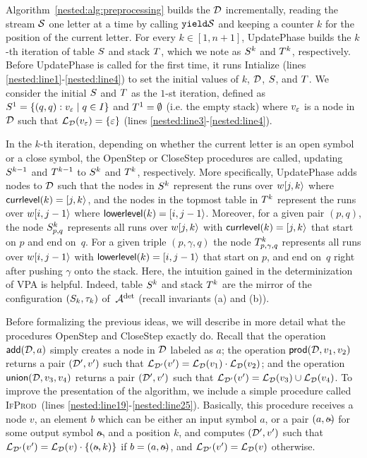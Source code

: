 Algorithm~\ref{nested:alg:preprocessing} builds the \dsepsabbr $\mathcal{D}$ incrementally, reading the stream $\mathcal{S}$ one letter at a time by calling $\texttt{yield}{\mathcal{S}}$ and keeping a counter $k$ for the position of the current letter. 
For every $k \in [1,n+1]$, {\sc UpdatePhase} builds the $k$-th iteration of table $S$ and stack $T$, which we note as $S^k$ and $T^k$, respectively. 
Before {\sc UpdatePhase} is called for the first time, it runs {\sc Intialize} (lines \ref{nested:line1}-\ref{nested:line4}) to set the initial values of $k$, $\mathcal{D}$, $S$, and $T$.
We consider the initial $S$ and $T$ as the $1$-st iteration, defined as $S^1 = \{(q,q): v_\varepsilon \mid q \in I\}$ and $T^1 = \emptyset$ (i.e. the empty stack) where $v_\varepsilon$ is a node in $\mathcal{D}$ such that $\mathcal{L}_{\mathcal{D}}(v_\varepsilon) = \{\varepsilon\}$ (lines \ref{nested:line3}-\ref{nested:line4}).

In the $k$-th iteration, depending on whether the current letter is an open symbol or a close symbol, the {\sc OpenStep} or {\sc CloseStep} procedures are called, updating $S^{k-1}$ and $T^{k-1}$ to $S^{k}$ and $T^{k}$, respectively.  
More specifically, {\sc UpdatePhase} adds nodes to $\mathcal{D}$ such that the nodes in $S^k$ represent the runs over $w[j,k\rangle$ where ${\sf currlevel}(k)=[j,k\rangle$, and the nodes in the topmost table in $T^k$ represent the runs over $w[i,j-1\rangle$ where ${\sf lowerlevel}(k) = [i,j-1\rangle$. 
Moreover, for a given pair $(p,q)$, the node $S^k_{p,q}$ represents all runs over $w[j,k\rangle$ with ${\sf currlevel}(k)=[j,k\rangle$ that start on $p$ and end on~$q$. For a given triple $(p,\gamma, q)$ the node $T^k_{p,\gamma, q}$ represents all runs over $w[i,j-1\rangle$ with ${\sf lowerlevel}(k) = [i,j-1\rangle$ that start on $p$, and end on~$q$ right after pushing $\gamma$ onto the stack. 
Here, the intuition gained in the determinization of VPA is helpful. Indeed, table $S^k$ and stack $T^k$ are the mirror of the configuration $(S_k, \tau_k)$ of~$\mathcal{A}^{\operatorname{det}}$ (recall invariants (a) and (b)).




Before formalizing the previous ideas, we will describe in more detail what the procedures {\sc OpenStep} and {\sc CloseStep} exactly do. Recall that the operation $\mathsf{add}(\mathcal{D}, a)$ simply creates a node in $\mathcal{D}$ labeled as $a$; the operation $\mathsf{prod}(\mathcal{D},v_1,v_2)$ returns a pair $(\mathcal{D}',v')$ such that $\mathcal{L}_{\mathcal{D}'}(v') = \mathcal{L}_{\mathcal{D}}(v_1) \cdot \mathcal{L}_{\mathcal{D}}(v_2)$; and the operation $\mathsf{union}(\mathcal{D},v_3,v_4)$ returns a pair $(\mathcal{D}',v')$ such that $\mathcal{L}_{\mathcal{D}'}(v') = \mathcal{L}_{\mathcal{D}}(v_3)\cup \mathcal{L}_{\mathcal{D}}(v_4)$. To improve the presentation of the algorithm, we include a simple procedure called \textsc{IfProd}~(lines \ref{nested:line19}-\ref{nested:line25}). Basically, this procedure receives a node $v$, an element $b$ which can be either an input symbol $a$, or a pair $(a, \oout)$ for some output symbol $\oout$, and a position $k$, and computes $(\mathcal{D}', v')$ such that $\cL_{\cD'}(v') = \cL_{\cD}(v) \cdot \{(\oout, k)\}$ if $b = (a, \oout)$, and $\mathcal{L}_{\mathcal{D}'}(v') = \mathcal{L}_{\mathcal{D}}(v)$ otherwise.


